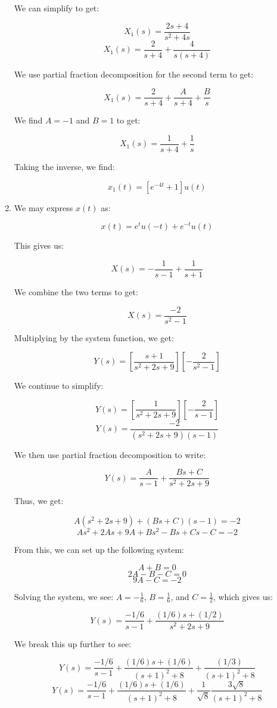 \begin{enumerate}
    We can simplify to get:

    $$X_1(s)=\frac{2s+4}{s^2+4s}$$
    $$X_1(s)=\frac{2}{s+4}+\frac{4}{s(s+4)}$$

    We use partial fraction decomposition for the second term to get:

    $$X_1(s)=\frac{2}{s+4}+\frac{A}{s+4}+\frac{B}{s}$$

    We find $A=-1$ and $B=1$ to get:

    $$X_1(s)=\frac{1}{s+4}+\frac{1}{s}$$

    Taking the inverse, we find:

    $$\boxed{x_1(t)=[e^{-4t}+1]u(t)}$$

  \item

    We may express $x(t)$ as:

    $$x(t)=e^{t}u(-t)+e^{-t}u(t)$$

    This gives us:

    $$X(s)=-\frac{1}{s-1}+\frac{1}{s+1}$$

    We combine the two terms to get:

    $$X(s)=\frac{-2}{s^2-1}$$

    Multiplying by the system function, we get:

    $$Y(s)=\left[ \frac{s+1}{s^2+2s+9} \right]\left[ -\frac{2}{s^2-1} \right]$$

    We continue to simplify:

    $$Y(s)=\left[ \frac{1}{s^2+2s+9} \right]\left[ -\frac{2}{s-1} \right]$$
    $$Y(s)=\frac{-2}{(s^2+2s+9)(s-1)}$$

    We then use partial fraction decomposition to write:

    $$Y(s)=\frac{A}{s-1}+\frac{Bs+C}{s^2+2s+9}$$

    Thus, we get:

    $$A(s^2+2s+9)+(Bs+C)(s-1)=-2$$
    $$As^2+2As+9A+Bs^2-Bs+Cs-C=-2$$

    From this, we can set up the following system:

    $$A+B=0$$
    $$2A-B-C=0$$
    $$9A-C=-2$$

    Solving the system, we see: $A=-\frac{1}{6}$, $B=\frac{1}{6}$, and $C=\frac{1}{2}$, which gives us:

    $$Y(s)=\frac{-1/6}{s-1}+\frac{(1/6)s+(1/2)}{s^2+2s+9}$$

    We break this up further to see:

    $$Y(s)=\frac{-1/6}{s-1}+\frac{(1/6)s+(1/6)}{(s+1)^2+8}+\frac{(1/3)}{(s+1)^2+8}$$
    $$Y(s)=\frac{-1/6}{s-1}+\frac{(1/6)s+(1/6)}{(s+1)^2+8}+\frac{1}{\sqrt{8}}\frac{3\sqrt{8}}{(s+1)^2+8}$$


\end{enumerate}
